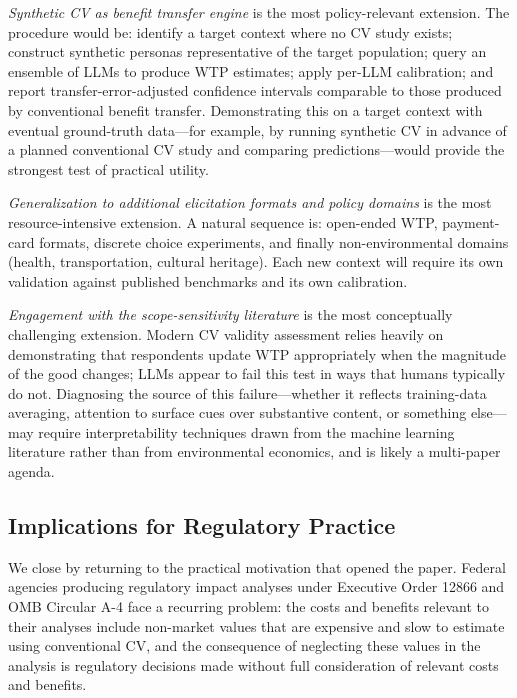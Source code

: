 \documentclass[12pt]{article}
\begin{document}
\textit{Synthetic CV as benefit transfer engine} is the most policy-relevant extension. The procedure would be: identify a target context where no CV study exists; construct synthetic personas representative of the target population; query an ensemble of LLMs to produce WTP estimates; apply per-LLM calibration; and report transfer-error-adjusted confidence intervals comparable to those produced by conventional benefit transfer. Demonstrating this on a target context with eventual ground-truth data---for example, by running synthetic CV in advance of a planned conventional CV study and comparing predictions---would provide the strongest test of practical utility.

\textit{Generalization to additional elicitation formats and policy domains} is the most resource-intensive extension. A natural sequence is: open-ended WTP, payment-card formats, discrete choice experiments, and finally non-environmental domains (health, transportation, cultural heritage). Each new context will require its own validation against published benchmarks and its own calibration.

\textit{Engagement with the scope-sensitivity literature} is the most conceptually challenging extension. Modern CV validity assessment relies heavily on demonstrating that respondents update WTP appropriately when the magnitude of the good changes; LLMs appear to fail this test in ways that humans typically do not. Diagnosing the source of this failure---whether it reflects training-data averaging, attention to surface cues over substantive content, or something else---may require interpretability techniques drawn from the machine learning literature rather than from environmental economics, and is likely a multi-paper agenda.

\subsection{Implications for Regulatory Practice}\label{sec:disc-policy}

We close by returning to the practical motivation that opened the paper. Federal agencies producing regulatory impact analyses under Executive Order 12866 and OMB Circular A-4 face a recurring problem: the costs and benefits relevant to their analyses include non-market values that are expensive and slow to estimate using conventional CV, and the consequence of neglecting these values in the analysis is regulatory decisions made without full consideration of relevant costs and benefits.
\end{document}
